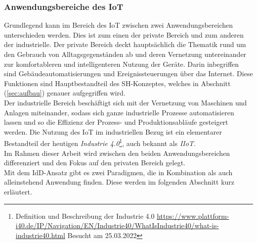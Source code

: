     \subsubsection*{Anwendungsbereiche des \acs{IoT}}
        Grundlegend kann im Bereich des \acl{IoT} zwischen zwei Anwendungsbereichen unterschieden werden. Dies ist zum einen der private Bereich und zum 
        anderen der industrielle. Der private Bereich deckt hauptsächlich die Thematik rund um den Gebrauch von Alltagsgegenständen ab und 
        deren Vernetzung untereinander zur komfortableren und intelligenteren Nutzung der Geräte. Darin inbegriffen sind 
        Gebäudeautomatisierungen und Ereignissteuerungen über das Internet. Diese Funktionen sind Hauptbestandteil des \acl{SH}-Konzeptes, welches 
        in Abschnitt (\ref{sec:aufbau}) genauer aufgegriffen wird. 
        \\
        \linebreak
        Der industrielle Bereich beschäftigt sich mit der Vernetzung von Maschinen und Anlagen miteinander, sodass sich ganze industrielle Prozesse 
        automatisieren lassen und so die Effizienz der Prozess- und Produktionsabläufe gesteigert werden. Die Nutzung des \acs{IoT} im industriellen Bezug 
        ist ein elementarer Bestandteil der heutigen \textit{Industrie 4.0}\footnote{Definition und Beschreibung der Industrie 4.0 \url{https://www.plattform-i40.de/IP/Navigation/EN/Industrie40/WhatIsIndustrie40/what-is-industrie40.html} Besucht am 25.03.2022},
        auch bekannt als \textit{\ac{IIoT}}. 
        \\
        Im Rahmen dieser Arbeit wird zwischen den beiden Anwendungsbereichen 
        differenziert und den Fokus auf den privaten Bereich gelegt. 
        \\
        \linebreak
        Mit dem \acl{IdD}-Ansatz gibt es zwei Paradigmen, die in Kombination als auch alleinstehend Anwendung finden. Diese werden im folgenden Abschnitt kurz erläutert.

